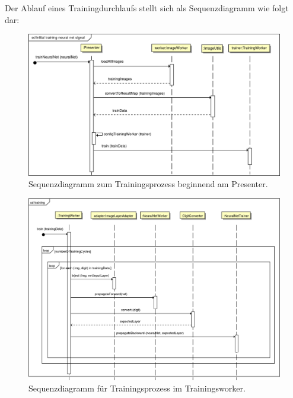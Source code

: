 Der Ablauf eines Trainingdurchlaufs stellt sich als Sequenzdiagramm wie folgt dar:
\begin{figure}[H]
\begin{center}
\includegraphics[width=14.2cm]{Abbildungen/UML/jan/trainNeuralNet.png}
\caption{Sequenzdiagramm zum Trainingsprozess beginnend am Presenter.}
\label{fig_sdTraining}
\end{center}
\end{figure}
\begin{figure}[H]
\begin{center}
\includegraphics[width=14.2cm]{Abbildungen/UML/jan/trainDetailed1.png}
\caption{Sequenzdiagramm für Trainingsprozess im Trainingsworker.}
\label{fig_sdTraining}
\end{center}
\end{figure}
\vspace{-0.5cm}
